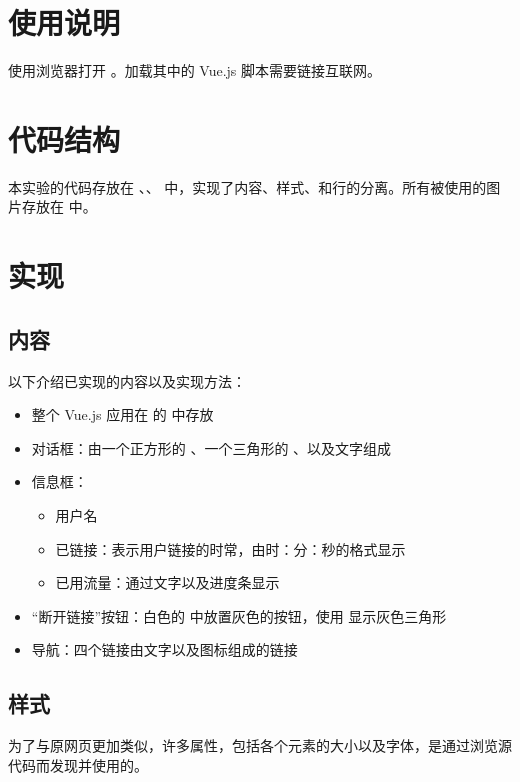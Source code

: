 \section{使用说明}

使用浏览器打开 。加载其中的 Vue.js 脚本需要链接互联网。

\section{代码结构}

本实验的代码存放在 、、 中，实现了内容、样式、和行的分离。所有被使用的图片存放在  中。

\section{实现}

\subsection{内容}

以下介绍已实现的内容以及实现方法：

\begin{itemize}
  \item 整个 Vue.js 应用在  的  中存放
  \item 对话框：由一个正方形的 、一个三角形的 、以及文字组成
  \item 信息框：
  \begin{itemize}
    \item 用户名
    \item 已链接：表示用户链接的时常，由时：分：秒的格式显示
    \item 已用流量：通过文字以及进度条显示
  \end{itemize}
  \item “断开链接”按钮：白色的  中放置灰色的按钮，使用  显示灰色三角形
  \item 导航：四个链接由文字以及图标组成的链接
\end{itemize}

\subsection{样式}

为了与原网页更加类似，许多属性，包括各个元素的大小以及字体，是通过浏览源代码而发现并使用的。

